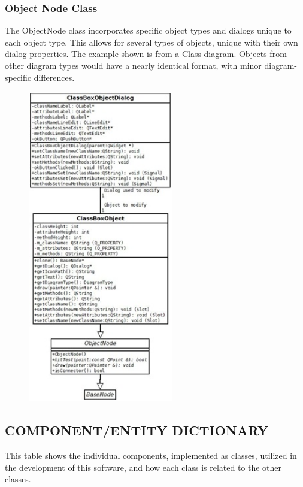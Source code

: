 \documentclass[twoside,letterpaper]{article}
\begin{document}
{\subsubsection[\ Object Node Class ]
{\bfseries Object Node Class }
{
The ObjectNode class incorporates specific object types and dialogs unique to each object type. This allows for several types of objects, unique with their own dialog properties. \newline
The example shown is from a Class diagram. Objects from other diagram types would have a nearly identical format, with minor diagram-specific differences.
}
  \begin{figure}[h]
  \centering
  \includegraphics[width=2.5in]{class_classboxobjectnode.jpeg}
  \end{figure}





\clearpage

\begin{landscape}

\subsection[COMPONENT/ENTITY DICTIONARY]
{\bfseries COMPONENT/ENTITY DICTIONARY}
{
This table shows the individual components, implemented as classes, 
utilized in the development of this software, 
and how each class is related to the other classes.
}


\end{landscape}}
\end{document}
